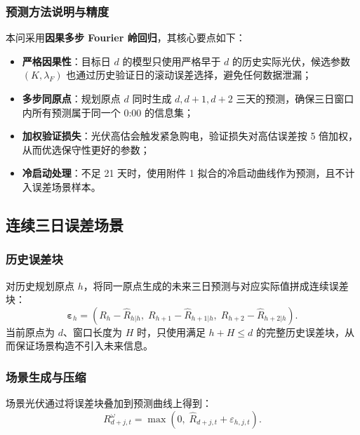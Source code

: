 \documentclass[withoutpreface,bwprint]{cumcmthesis} %
\begin{document}
\subsubsection{预测方法说明与精度}

本问采用\textbf{因果多步 Fourier 岭回归}，其核心要点如下：
\begin{itemize}
    \item \textbf{严格因果性}：目标日 $d$ 的模型只使用严格早于 $d$ 的历史实际光伏，候选参数 $(K,\lambda_F)$ 也通过历史验证日的滚动误差选择，避免任何数据泄漏；
    \item \textbf{多步同原点}：规划原点 $d$ 同时生成 $d, d+1, d+2$ 三天的预测，确保三日窗口内所有预测属于同一个 0:00 的信息集；
    \item \textbf{加权验证损失}：光伏高估会触发紧急购电，验证损失对高估误差按 5 倍加权，从而优选保守性更好的参数；
    \item \textbf{冷启动处理}：不足 21 天时，使用附件 1 拟合的冷启动曲线作为预测，且不计入误差场景样本。
\end{itemize}

\subsection{连续三日误差场景}

\subsubsection{历史误差块}

对历史规划原点 $h$，将同一原点生成的未来三日预测与对应实际值拼成连续误差块：
\begin{equation}
    \boldsymbol{\varepsilon}_h = \left(R_h-\hat{R}_{h|h},\; R_{h+1}-\hat{R}_{h+1|h},\; R_{h+2}-\hat{R}_{h+2|h}\right).
    \label{eq:q2-error-block}
\end{equation}
当前原点为 $d$、窗口长度为 $H$ 时，只使用满足 $h+H\le d$ 的完整历史误差块，从而保证场景构造不引入未来信息。

\subsubsection{场景生成与压缩}

场景光伏通过将误差块叠加到预测曲线上得到：
\begin{equation}
    R_{d+j,t}^{\omega} = \max\left(0,\; \hat{R}_{d+j,t} + \varepsilon_{h,j,t}\right).
    \label{eq:q2-scenario-pv}
\end{equation}
\end{document}
